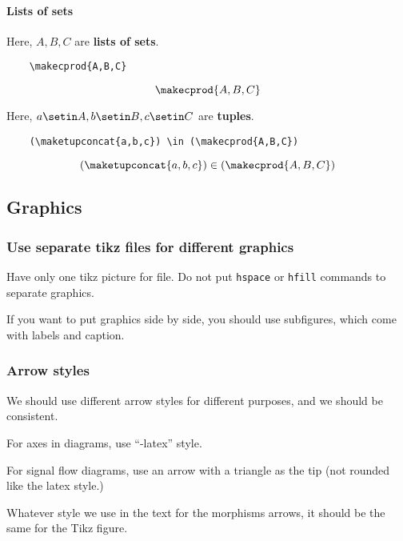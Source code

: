 \paragraph{Lists of sets}
Here, $A, B, C$ are \textbf{lists of sets}.
\begin{verbatim}
    \makecprod{A,B,C}
\end{verbatim}
\begin{equation}
    \makecprod{A,B,C}
\end{equation}

Here, $a \setin A, b \setin B, c \setin C$ are \textbf{tuples}.
\begin{verbatim}
    (\maketupconcat{a,b,c}) \in (\makecprod{A,B,C})
\end{verbatim}
\begin{equation}
    (\maketupconcat{a,b,c})
    \in (\makecprod{A,B,C})
\end{equation}

\vfill\pagebreak

\subsection{Graphics}

\subsubsection*{Use separate tikz files for different graphics}

Have only one tikz picture for file.
Do not put \texttt{hspace} or \texttt{hfill} commands to separate graphics.

If you want to put graphics side by side, you should use subfigures, which come with labels and caption.

\subsubsection*{Arrow styles}

We should use different arrow styles for different purposes,
and we should be consistent.

For axes in diagrams, use ``-latex'' style.

For signal flow diagrams, use an arrow with a triangle as the tip (not rounded like the latex style.)

Whatever style we use in the text for the morphisms arrows, it should be the same for the Tikz figure.

\vfill\pagebreak

